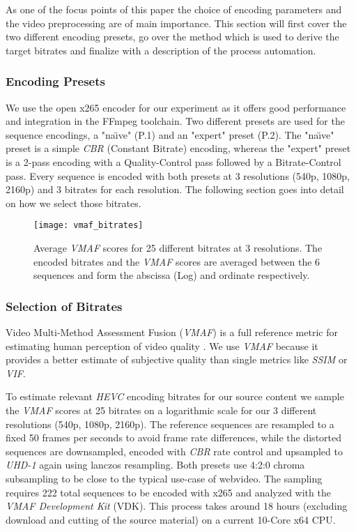 As one of the focus points of this paper the choice of encoding parameters and the video preprocessing are of main importance. This section will first cover the two different encoding presets, go over the method which is used to derive the target bitrates and finalize with a description of the process automation.

\subsubsection{Encoding Presets}
We use the open x265 encoder for our experiment as it offers good performance and integration in the FFmpeg toolchain. Two different presets are used for the sequence encodings, a "na\"{\i}ve" (P.1) and an "expert" preset (P.2). The "na\"{\i}ve" preset is a simple \textit{CBR} (Constant Bitrate) encoding, whereas the "expert" preset is a 2-pass encoding with a Quality-Control pass followed by a Bitrate-Control pass.  Every sequence is encoded with both presets at 3 resolutions (540p, 1080p, 2160p) and 3 bitrates for each resolution. The following section goes into detail on how we select those bitrates.

\begin{figure}[htb!]
	\centering
	\texttt{[image: vmaf\_bitrates]}
	\caption{Average \textit{VMAF} scores for 25 different bitrates at 3 resolutions. The encoded bitrates and the \textit{VMAF} scores are averaged between the 6 sequences and form the abscissa (Log) and ordinate respectively.}
	\label{fig:vmaf:bitrates}
\end{figure}

\subsubsection{Selection of Bitrates}
Video Multi-Method Assessment Fusion (\textit{VMAF}) is a full reference metric for estimating human perception of video quality \cite{lin2013:mmf}. We use \textit{VMAF} because it provides a better estimate of subjective quality than single metrics like \textit{SSIM} or \textit{VIF}.

To estimate relevant \textit{HEVC} encoding bitrates for our source content we sample the \textit{VMAF} scores at 25 bitrates on a logarithmic scale for our 3 different resolutions (540p, 1080p, 2160p). The reference sequences are resampled to a fixed 50 frames per seconds to avoid frame rate differences, while the distorted sequences are downsampled, encoded with \textit{CBR} rate control and upsampled to \textit{UHD-1} again using lanczos resampling. Both presets use 4:2:0 chroma subsampling to be close to the typical use-case of webvideo. The sampling requires 222 total sequences to be encoded with x265 and analyzed with the \textit{VMAF Development Kit} (VDK). This process takes around 18 hours (excluding download and cutting of the source material) on a current 10-Core x64 CPU.


